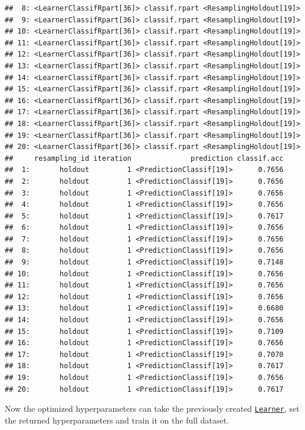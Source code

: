 \documentclass[
]{scrbook}
\begin{document}
\begin{verbatim}
##  8: <LearnerClassifRpart[36]> classif.rpart <ResamplingHoldout[19]>
##  9: <LearnerClassifRpart[36]> classif.rpart <ResamplingHoldout[19]>
## 10: <LearnerClassifRpart[36]> classif.rpart <ResamplingHoldout[19]>
## 11: <LearnerClassifRpart[36]> classif.rpart <ResamplingHoldout[19]>
## 12: <LearnerClassifRpart[36]> classif.rpart <ResamplingHoldout[19]>
## 13: <LearnerClassifRpart[36]> classif.rpart <ResamplingHoldout[19]>
## 14: <LearnerClassifRpart[36]> classif.rpart <ResamplingHoldout[19]>
## 15: <LearnerClassifRpart[36]> classif.rpart <ResamplingHoldout[19]>
## 16: <LearnerClassifRpart[36]> classif.rpart <ResamplingHoldout[19]>
## 17: <LearnerClassifRpart[36]> classif.rpart <ResamplingHoldout[19]>
## 18: <LearnerClassifRpart[36]> classif.rpart <ResamplingHoldout[19]>
## 19: <LearnerClassifRpart[36]> classif.rpart <ResamplingHoldout[19]>
## 20: <LearnerClassifRpart[36]> classif.rpart <ResamplingHoldout[19]>
##     resampling_id iteration              prediction classif.acc
##  1:       holdout         1 <PredictionClassif[19]>      0.7656
##  2:       holdout         1 <PredictionClassif[19]>      0.7656
##  3:       holdout         1 <PredictionClassif[19]>      0.7656
##  4:       holdout         1 <PredictionClassif[19]>      0.7656
##  5:       holdout         1 <PredictionClassif[19]>      0.7617
##  6:       holdout         1 <PredictionClassif[19]>      0.7656
##  7:       holdout         1 <PredictionClassif[19]>      0.7656
##  8:       holdout         1 <PredictionClassif[19]>      0.7656
##  9:       holdout         1 <PredictionClassif[19]>      0.7148
## 10:       holdout         1 <PredictionClassif[19]>      0.7656
## 11:       holdout         1 <PredictionClassif[19]>      0.7656
## 12:       holdout         1 <PredictionClassif[19]>      0.7656
## 13:       holdout         1 <PredictionClassif[19]>      0.6680
## 14:       holdout         1 <PredictionClassif[19]>      0.7656
## 15:       holdout         1 <PredictionClassif[19]>      0.7109
## 16:       holdout         1 <PredictionClassif[19]>      0.7656
## 17:       holdout         1 <PredictionClassif[19]>      0.7070
## 18:       holdout         1 <PredictionClassif[19]>      0.7617
## 19:       holdout         1 <PredictionClassif[19]>      0.7656
## 20:       holdout         1 <PredictionClassif[19]>      0.7617
\end{verbatim}

Now the optimized hyperparameters can take the previously created \href{https://mlr3.mlr-org.com/reference/Learner.html}{\texttt{Learner}}, set the returned hyperparameters and train it on the full dataset.
\end{document}
